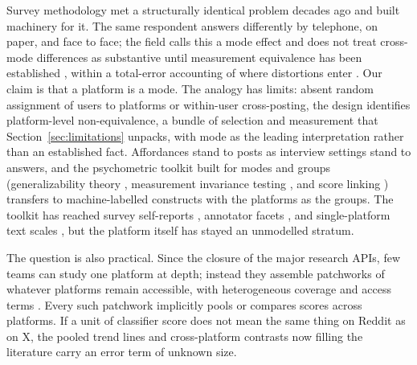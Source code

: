 Survey methodology met a structurally identical problem decades ago
and built machinery for it. The same respondent answers differently by
telephone, on paper, and face to face; the field calls this a mode
effect and does not treat cross-mode differences as substantive until
measurement equivalence has been established
\citep{tourangeau2000,klausch2013,hox2015}, within a total-error
accounting of where distortions enter \citep{groves2010}. Our claim is that a platform is a mode. The analogy has limits: absent random assignment of users to platforms or within-user cross-posting, the design identifies platform-level non-equivalence, a bundle of selection and measurement that Section~\ref{sec:limitations} unpacks, with mode as the leading interpretation rather than an established fact. Affordances stand to posts as interview
settings stand to answers, and the psychometric toolkit built for modes and groups (generalizability theory \citep{cronbach1972,brennan2001}, measurement invariance testing \citep{meredith1993,putnick2016}, and score linking \citep{kolen2014}) transfers to machine-labelled constructs with the platforms as the groups. The toolkit has reached survey self-reports \citep{boyd2024},
annotator facets \citep{kennedy2020,sachdeva2022}, and single-platform
text scales \citep{pokropek2026}, but the platform itself has stayed
an unmodelled stratum.

The question is also practical. Since the closure of the major
research APIs, few teams can study one platform at depth; instead they
assemble patchworks of whatever platforms remain accessible, with
heterogeneous coverage and access terms
\citep{davidson2023,goanta2026}. Every such patchwork implicitly pools
or compares scores across platforms. If a unit of classifier score
does not mean the same thing on Reddit as on X, the pooled trend lines
and cross-platform contrasts now filling the literature carry an error term of unknown size.

